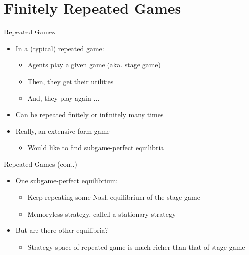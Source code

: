 \documentclass[11pt,aspectratio=169,handout]{beamer}
\subtitle{\vspace{2.1em}Lecture 6: Repeated Games}
\begin{document}
 \begin{frame}[plain]
  \titlepage
 \end{frame}
 
 
 \section{Finitely Repeated Games}
  \begin{frame}{Repeated Games}
   \begin{itemize}[<+->]
   \setlength{\itemsep}{1.2em}
    \item In a (typical) repeated game:
    \begin{itemize}[<.->]
     \item Agents play a given game (aka. \alert{stage game})
     \item Then, they get their utilities
     \item And, they play again $\dots$
    \end{itemize}
    \item Can be repeated \alert{finitely} or \alert{infinitely} many times
    \item Really, an extensive form game
    \begin{itemize}[<.->]
    \item Would like to find subgame-perfect equilibria
    \end{itemize}
   \end{itemize}
  \end{frame}
  
  
  \begin{frame}{Repeated Games (cont.)}
   \begin{itemize}[<+->]
   \setlength{\itemsep}{1.2em}
    \item One subgame-perfect equilibrium:
    \begin{itemize}[<.->]
     \item Keep repeating some Nash equilibrium of the stage game 
     \item \alert{Memoryless} strategy, called a \alert{stationary strategy}
    \end{itemize}
    \item But are there other equilibria?
    \begin{itemize}[<.->]
     \item Strategy space of repeated game is much richer than that of stage game
    \end{itemize}
   \end{itemize}
  \end{frame}
\end{document}
